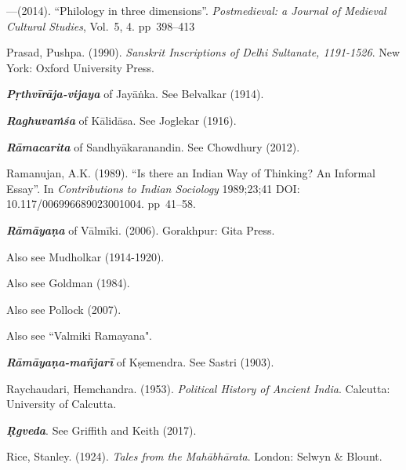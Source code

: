 \begin{thebibliography}{99}
---\kern3pt(2014). “Philology in three dimensions”. {\sl Postmedieval: a Journal of Medieval Cultural Studies}, Vol.~5, 4. pp~398--413

Prasad, Pushpa. (1990). {\sl Sanskrit Inscriptions of Delhi Sultanate, 1191-1526}. New York: Oxford University Press. 

{\sl\bfseries Pṛthvīrāja-vijaya} of Jayāṅka. See Belvalkar (1914).

{\sl\bfseries Raghuvaṁśa} of Kālidāsa. See Joglekar (1916).

{\sl\bfseries Rāmacarita} of Sandhyākaranandin. See Chowdhury (2012).

Ramanujan, A.K. (1989). “Is there an Indian Way of Thinking? An Informal Essay”. In {\sl Contributions to Indian Sociology} 1989;23;41 DOI: 10.117/006996689023001004. pp~41--58.

{\sl\bfseries Rāmāyaṇa} of Vālmīki. (2006). Gorakhpur: Gita Press.

Also see Mudholkar (1914-1920).

Also see Goldman (1984).

Also see Pollock (2007). 

Also see ``Valmiki Ramayana".





%

{\sl\bfseries Rāmāyaṇa-mañjarī} of Kṣemendra. See Sastri (1903).

Raychaudari, Hemchandra. (1953). {\sl Political History of Ancient India}. Calcutta: University of Calcutta.

{\sl\bfseries Ṛgveda}. See Griffith and Keith (2017).


Rice, Stanley. (1924). {\sl Tales from the Mahābhārata}. London: Selwyn \& Blount. 


\end{thebibliography}
